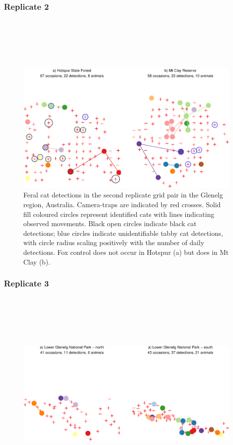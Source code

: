 \documentclass[11pt,a4paper,titlepage,twoside,openright]{style/unimelbthesis}
\begin{document}
\begin{mainmatter}
\hypertarget{replicate-2}{%
\subsubsection{Replicate 2}\label{replicate-2}}

\(~\)

\(~\)

\(~\)
\begin{figure}

{\centering \includegraphics[width=1\linewidth]{figure/density-plot-ch-2-1} 

}

\caption{Feral cat detections in the second replicate grid pair in the Glenelg region, Australia. Camera-traps are indicated by red crosses. Solid fill coloured circles represent identified cats with lines indicating observed movements. Black open circles indicate black cat detections; blue circles indicate unidentifiable tabby cat detections, with circle radius scaling positively with the number of daily detections. Fox control does not occur in Hotspur (a) but does in Mt Clay (b).}\label{fig:density-plot-ch-2}
\end{figure}
\newpage

\hypertarget{replicate-3}{%
\subsubsection{Replicate 3}\label{replicate-3}}

\(~\)

\(~\)

\(~\)
\begin{figure}

{\centering \includegraphics[width=1\linewidth]{figure/density-plot-ch-3-1} 

}
\end{figure}
\end{mainmatter}
\end{document}
